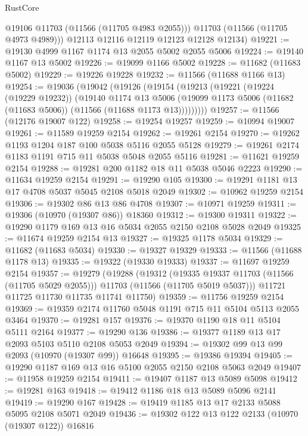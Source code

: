 \begin{lexlean}{RustCore}
\begin{coremodule}
          @19106
          @11703
          (@11566 (@11705 @4983 @2055)))
        @11703
        (@11566 (@11705 @4973 @4989)))
      @12113
      @12116
      @12119
      @12123
      @12128
      @12134)
@19221 := @19130 @4999 @1167 @1174 @13 @2055 @5002 @2055 @5006
@19224 := @19140 @1167 @13 @5002
@19226 := @19099 @1166 @5002
@19228 := @11682 (@11683 @5002)
@19229 := @19226 @19228
@19232 := @11566 (@11688 @1166 @13)
@19254 := @19036
    (@19042
      (@19126
        (@19154
          (@19213
            (@19221
              (@19224 (@19229 @19232))
              (@19140
                @1174
                @13
                @5006
                (@19099 @1173 @5006 (@11682 (@11683 @5006)) (@11566 (@11688 @1173 @13)))))))))
@19257 := @11566 (@12176 @19007 @122)
@19258 := @19254 @19257
@19259 := @10994 @19007
@19261 := @11589 @19259 @2154
@19262 := @19261 @2154
@19270 := @19262 @1193 @1204 @187 @100 @5038 @5116 @2055 @5128
@19279 := @19261 @2174 @1183 @1191 @715 @11 @5038 @5048 @2055 @5116
@19281 := @11621 @19259 @2154
@19288 := @19281 @200 @1182 @18 @11 @5038 @5046 @2223
@19290 := @11634 @19259 @2154
@19291 := @19290 @105
@19300 := @19291 @1181 @13 @17 @4708 @5037 @5045 @2108 @5018 @2049
@19302 := @10962 @19259 @2154
@19306 := @19302 @86 @13 @86 @4708
@19307 := @10971 @19259
@19311 := @19306 (@10970 (@19307 @86)) @18360
@19312 := @19300 @19311
@19322 := @19290 @1179 @169 @13 @16 @5034 @2055 @2150 @2108 @5028 @2049
@19325 := @11674 @19259 @2154 @13
@19327 := @19325 @1178 @5034
@19329 := @11682 (@11683 @5034)
@19330 := @19327 @19329
@19333 := @11566 (@11688 @1178 @13)
@19335 := @19322 (@19330 @19333)
@19337 := @11697 @19259 @2154
@19357 := @19279
    (@19288
      (@19312
        (@19335 @19337 @11703 (@11566 (@11705 @5029 @2055)))
        @11703
        (@11566 (@11705 @5019 @5037)))
      @11721
      @11725
      @11730
      @11735
      @11741
      @11750)
@19359 := @11756 @19259 @2154
@19369 := @19359 @2174 @11760 @5048 @1191 @715 @11 @5104 @5113 @2055 @3464
@19370 := @19281 @157
@19376 := @19370 @1190 @18 @11 @5104 @5111 @2164
@19377 := @19290 @136
@19386 := @19377 @1189 @13 @17 @2093 @5103 @5110 @2108 @5053 @2049
@19394 := @19302 @99 @13 @99 @2093 (@10970 (@19307 @99)) @16648
@19395 := @19386 @19394
@19405 := @19290 @1187 @169 @13 @16 @5100 @2055 @2150 @2108 @5063 @2049
@19407 := @11958 @19259 @2154
@19411 := @19407 @1187 @13 @5089 @5098
@19412 := @19281 @163
@19418 := @19412 @1186 @18 @13 @5089 @5096 @2141
@19419 := @19290 @167
@19428 := @19419 @1185 @13 @17 @2133 @5088 @5095 @2108 @5071 @2049
@19436 := @19302 @122 @13 @122 @2133 (@10970 (@19307 @122)) @16816

\end{coremodule}
\end{lexlean}
